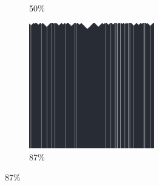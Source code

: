 \documentclass[12pt, fleqn]{report}                             %
\theoremstyle{break}                                            %
\begin{document}
\begin{figure}[ht!]
\begin{subfigure}[b]{0.4\linewidth}
          \caption{50\%}
        \end{subfigure}
        \begin{subfigure}[b]{0.4\linewidth}
          \includegraphics[width=0.6\textwidth]{Images/132/d.png}
          \caption{87\%}
        \end{subfigure}
      \end{figure}
\end{document}
